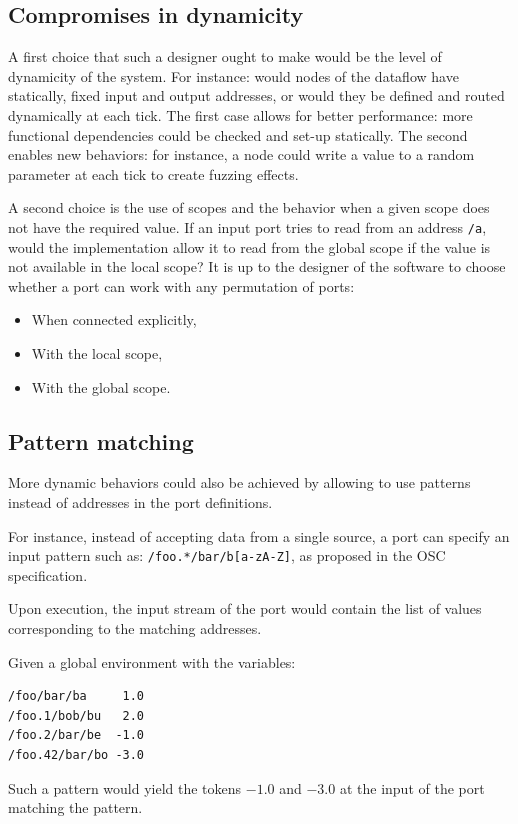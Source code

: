 \documentclass{article}
\begin{document}
\subsection{Compromises in dynamicity}
A first choice that such a designer ought to make would be the level of dynamicity of the system.
For instance: would nodes of the dataflow have statically, fixed input and output addresses, or would they be defined and routed dynamically at each tick.
The first case allows for better performance: more functional dependencies could be checked and set-up statically.
The second enables new behaviors: for instance, a node could write a value to a random parameter at each tick to create fuzzing effects.

A second choice is the use of scopes and the behavior when a given scope does not have the required value.
If an input port tries to read from an address \lstinline|/a|, would the implementation allow it to read from the global scope if the value is not available in the local scope?
It is up to the designer of the software to choose whether a port can work with any permutation of ports: 
\begin{itemize}
	\item When connected explicitly,
	\item With the local scope,
	\item With the global scope.
\end{itemize} 

\subsection{Pattern matching}
More dynamic behaviors could also be achieved by allowing to use patterns instead of addresses in the port definitions.

For instance, instead of accepting data from a single source, a port can specify an input pattern such as: \lstinline|/foo.*/bar/b[a-zA-Z]|, as proposed in the OSC specification.

Upon execution, the input stream of the port would contain the list of values corresponding to the matching addresses.

Given a global environment with the variables: 
\begin{lstlisting}
/foo/bar/ba     1.0
/foo.1/bob/bu   2.0
/foo.2/bar/be  -1.0
/foo.42/bar/bo -3.0
\end{lstlisting}

Such a pattern would yield the tokens $-1.0$ and $-3.0$ at the input of the port matching the pattern.
\end{document}
